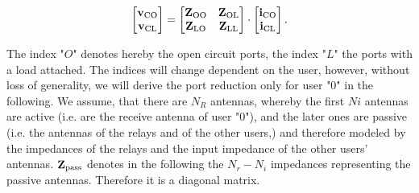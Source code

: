 \begin{align}
\label{eq:ocl_matrix}
\begin{bmatrix}
\mathbf{v}_\text{CO} \\
\mathbf{v}_\text{CL}
\end{bmatrix}
=
\begin{bmatrix}
\mathbf{Z}_\text{OO} & \mathbf{Z}_\text{OL}\\
\mathbf{Z}_\text{LO} & \mathbf{Z}_\text{LL}
\end{bmatrix}\cdot
\begin{bmatrix}
\mathbf{i}_\text{CO} \\
\mathbf{i}_\text{CL}
\end{bmatrix}.
\end{align}

The index "$O$" denotes hereby the open circuit ports, the index "$L$" the ports with a load attached.
The indices will change dependent on the user, however, without loss of generality, we will derive the port reduction only for user "0" in the following.
We assume, that there are $N_R$ antennas, whereby the first $Ni$ antennas are active (i.e. are the receive antenna of user "0"), and the later ones are passive (i.e. the antennas of the relays and of the other users,) and therefore modeled by the impedances of the relays and the input impedance of the other users' antennas.
$\mathbf{Z}_{\text{pass}}$ denotes in the following the $N_r - N_i$ impedances representing the passive antennas.
Therefore it is a diagonal matrix.

